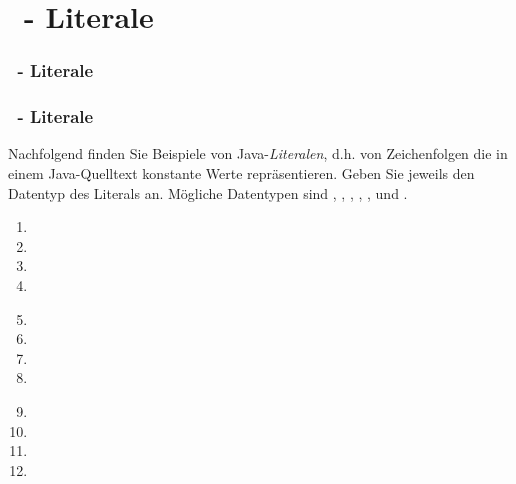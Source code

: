 \def\stitle{\theexercise\ - Literale}
\section{\stitle}
\begin{frame}%
  \frametitle{\stitle}%
\tableofcontents[current]
\end{frame}

\begin{frame}[fragile]%
  \frametitle{\stitle}%


Nachfolgend finden Sie Beispiele von Java-\emph{Literalen}, d.h. von Zeichenfolgen die in einem Java-Quelltext konstante Werte repräsentieren.
Geben Sie jeweils den Datentyp des Literals an.
Mögliche Datentypen sind , , , , ,  und .

\begin{center}

\begin{minipage}{0.3\textwidth}
\begin{enumerate}
\item {}
\item {}
\item {}
\item {}
\end{enumerate}
\end{minipage}
\hfill
\begin{minipage}{0.3\textwidth}
\begin{enumerate}
\setcounter{enumi}{4}
\item {}
\item {}
\item {}
\item {}
\end{enumerate}
\end{minipage}
\hfill
\begin{minipage}{0.3\textwidth}
\begin{enumerate}
\setcounter{enumi}{8}
\item {}
\item {}
\item {}
\item {}
\end{enumerate}
\end{minipage}

\end{center}
\end{frame}


